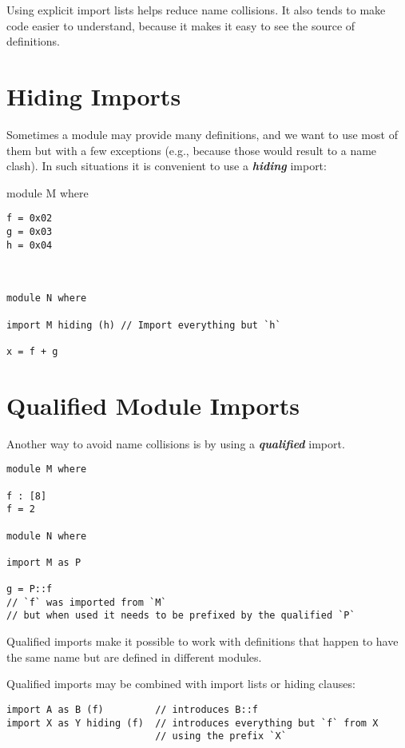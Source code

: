 Using explicit import lists helps reduce name collisions. It also tends
to make code easier to understand, because it makes it easy to see the
source of definitions.

\section{Hiding Imports}\label{hiding-imports}

Sometimes a module may provide many definitions, and we want to use most
of them but with a few exceptions (e.g., because those would result to a
name clash). In such situations it is convenient to use a
\textbf{\emph{hiding}} import:

module M where

\begin{verbatim}
f = 0x02
g = 0x03
h = 0x04



module N where

import M hiding (h) // Import everything but `h`

x = f + g
\end{verbatim}

\section{Qualified Module Imports}\label{qualified-module-imports}

Another way to avoid name collisions is by using a
\textbf{\emph{qualified}} import.

\begin{verbatim}
module M where

f : [8]
f = 2

module N where

import M as P

g = P::f
// `f` was imported from `M`
// but when used it needs to be prefixed by the qualified `P`
\end{verbatim}

Qualified imports make it possible to work with definitions that happen
to have the same name but are defined in different modules.

Qualified imports may be combined with import lists or hiding clauses:

\begin{verbatim}
import A as B (f)         // introduces B::f
import X as Y hiding (f)  // introduces everything but `f` from X
                          // using the prefix `X`
\end{verbatim}

